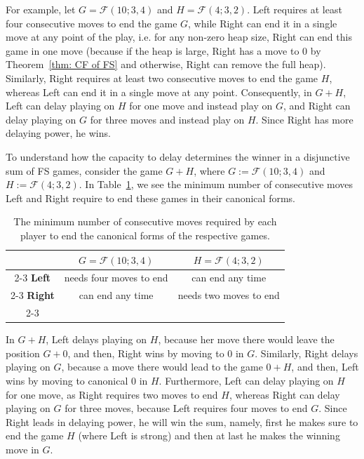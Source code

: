 \documentclass[oneside,reqno]{amsart}
\newcommand{\fs}{\mathcal{F}}
\begin{document}
For example, let $G=\fs(10;3,4)$ and $H=\fs(4;3,2)$. Left requires at least four consecutive moves to end the game $G$, while Right can end it in a single move at any point of the play, i.e. for any non-zero heap size, Right can end this game in one move (because if the heap is large, Right has a move to 0 by Theorem~\ref{thm: CF of FS} and otherwise, Right can remove the full heap). Similarly, Right requires at least two consecutive moves to end the game $H$, whereas Left can end it in a single move at any point. Consequently, in $G+H$, Left can delay playing on $H$ for one move and instead play on $G$, and Right can delay playing on $G$ for three moves and instead play on $H$. Since Right has more delaying power, he wins.
\fi

To understand how the capacity to delay determines the winner in a disjunctive sum of {\sc FS} games, consider the game $G+H$, where $G := \fs(10;3,4)$ and $H := \fs(4;3,2)$. In Table~\ref{fig: game comparison}, we see the minimum number of consecutive moves Left and Right require to end these games in their canonical forms.\\ 

\begin{table}[!htbp]\caption{The minimum number of consecutive moves required by each player to end the canonical forms of  the respective games.}
    \label{fig: game comparison}
    \centering
    \renewcommand{\arraystretch}{1.5}
    \begin{tabular}{c | c | c |}
        \multicolumn{1}{c}{} & 
        \multicolumn{1}{c}{\textbf{$G= \fs(10;3,4)$}} & 
        \multicolumn{1}{c}{\textbf{$H=\fs(4;3,2)$}} \\ \cline{2-3} 
        \textbf{Left} & needs four moves to end & can end any time\\ \cline{2-3} 
        \textbf{Right} & can end any time & needs two moves to end \\ \cline{2-3} 
    \end{tabular}
\end{table}

In $G+H$, Left delays playing on $H$, because her move there would leave the position $G+0$, and then, Right wins by moving to $0$ in $G$. Similarly, Right delays playing on $G$, because a move there would lead to the game $0+H$, and then, Left wins by moving to canonical $0$ in $H$. Furthermore, Left can delay playing on $H$ for one move, as Right requires two moves to end $H$, whereas Right can delay playing on $G$ for three moves, because Left requires four moves to end $G$. Since Right leads in delaying power, he will win the sum, namely, first he makes sure to end the game $H$ (where Left is strong) and then at last he  makes the winning move in $G$. 
\end{document}

